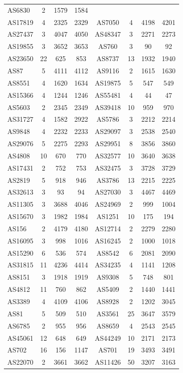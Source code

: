 \documentclass[10pt,journal,compsoc]{IEEEtran}
\begin{document}
\begin{table}[ht]
{\begin{tabular}{lc|cc||cc||cc}
AS6830 &2 &1579 &1584\\
AS17819 &4 &2325 &2329& 
AS7050 & 4&4198 &4201\\
AS27437 & 3& 4047& 4050& 
AS48347 & 3&2271 &2273\\
AS19855 & 3&3652 &3653&
AS760& 3& 90 &92\\
AS23650 & 22&625& 853& 
AS8737 & 13&1932 &1940\\
AS87 & 5&4111 &4112& 
AS9116 &2&1615& 1630\\
AS8551 & 4&1620 &1634& 
AS19875& 5& 547& 549\\
AS15366 & 4&1244& 1246& 
AS55481 & 4&44 &47\\
AS5603 & 2&2345 &2349&
AS39418 &10 &959 &970\\
AS31727 & 4&1582& 2922& 
AS5786 & 3&2212 &2214\\
AS9848 & 4&2232 &2233& 
AS29097 & 3&2538& 2540\\
AS29076 &5 &2275 &2293& 
AS29951 & 8&3856& 3860\\
AS4808&10 & 670& 770&
AS32577 & 10&3640 &3638\\
AS17431& 2& 752 &753& 
AS32475& 3& 3728& 3729\\
AS2819& 5& 918 &946& 
AS3786 & 13&2215& 2225\\
AS32613 &3 &93 &94& 
AS27030 & 3&4467& 4469 \\
AS11305 & 3&3688 &4046& 
AS24969 & 2&999 &1004\\
AS15670 & 3&1982 &1984& 
AS1251 & 10&175 &194\\
AS156 & 2&4179& 4180& 
AS12714&2 & 2279& 2280\\
AS16095 &3 &998 &1016& 
AS16245 & 2&1000 &1018\\
AS15290 & 6&536 &574&
AS8542& 6& 2081& 2090\\
AS31815 &11 &4236& 4414&
AS34235 & 4&1141 &1208\\
AS8151 & 3&1918 &1919&
AS9308 & 5&748 &801\\
AS4812 & 11&760 &862& 
AS5409 & 2&1440& 1441\\
AS3389& 4& 4109 &4106&
AS8928& 2& 1202 &3045\\
AS81&5 & 509& 510&
AS3561 &25 &3647& 3579\\
AS6785 & 2&955 &956& 
AS8659 & 4&2543 &2545\\
AS45061 & 12&648 &649& 
AS44249& 10& 2171& 2173\\
AS702& 16& 156 &1147 &
AS701 & 19&3493 &3491\\
AS22070 & 2&3661& 3662& 
AS11426&50 & 3207 &3163 \\

\end{tabular}}
\end{table}
\end{document}
